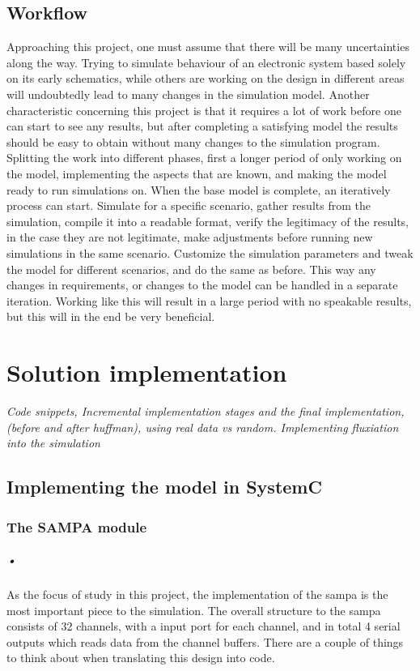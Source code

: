 \documentclass[a4paper, 12pt]{report}
\begin{document}
\section{Workflow}
Approaching this project, one must assume that there will be many uncertainties along the way.
Trying to simulate behaviour of an electronic system based solely on its early schematics, while others are working on the design in different areas will undoubtedly lead to many changes in the simulation model.
Another characteristic concerning this project is that it requires a lot of work before one can start to see any results, but after completing a satisfying  model the results should be easy to obtain without many changes to the simulation program.
Splitting the work into different phases, first a longer period of only working on the model, implementing the aspects that are known, and making the model ready to run simulations on.
When the base model is complete, an iteratively process can start.
Simulate for a specific scenario, gather results from the simulation, compile it into a readable format, verify the legitimacy of the results, in the case they are not legitimate, make adjustments before running new simulations in the same scenario.
Customize the simulation parameters and tweak the model for different scenarios, and do the same as before.
This way any changes in requirements, or changes to the model can be handled in a separate iteration.
Working like this will result in a large period with no speakable results, but this will in the end be very beneficial.

\chapter{Solution implementation}
\textit{Code snippets, Incremental implementation stages and the final implementation, (before and after huffman), using real data vs random. Implementing fluxiation into the simulation}
\section{Implementing the model in SystemC}
\subsection{The SAMPA module}

\paragraph{•}
As the focus of study in this project, the implementation of the \gls{sampa} is the most important piece to the simulation.
The overall structure to the \gls{sampa} consists of 32 channels, with a input port for each channel, and in total 4 serial outputs which reads data from the channel buffers.
There are a couple of things to think about when translating this design into code.
\end{document}
